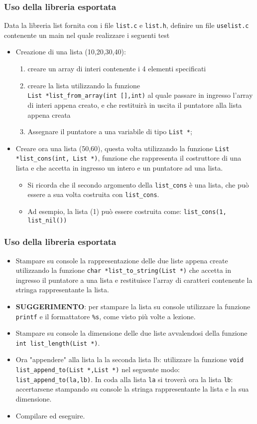 \documentclass{beamer}
\begin{document}
\begin{frame}[fragile]
\frametitle{Uso della libreria esportata}
Data la libreria list fornita con i file \texttt{list.c} e \texttt{list.h}, definire un file \texttt{uselist.c} contenente un main nel quale realizzare i seguenti test
\begin{itemize}
 \item Creazione di una lista (10,20,30,40):
\begin{enumerate}
 \item creare un array di interi contenente i 4 elementi specificati
 \item creare la lista utilizzando la funzione \\ \texttt{List *list\_from\_array(int [],int)} al quale passare in ingresso l'array di interi appena creato, e che restituirà in uscita il puntatore alla lista appena creata
 \item Assegnare il puntatore a una variabile di tipo \texttt{List *};
\end{enumerate}
 \item Creare ora una lista (50,60), questa volta utilizzando la funzione \texttt{List *list\_cons(int, List *)}, funzione che rappresenta il costruttore di una lista e che accetta in ingresso un intero e un puntatore ad una lista.
 \begin{itemize}
  \item Si ricorda che il secondo argomento della \texttt{list\_cons} è una lista, che può essere a sua volta costruita con \texttt{list\_cons}.
  \item Ad esempio, la lista (1) può essere costruita come: \texttt{list\_cons(1, list\_nil())}
 \end{itemize}

\end{itemize}
\end{frame}

\begin{frame}[fragile]
\frametitle{Uso della libreria esportata}
\begin{itemize}
 \item Stampare su console la rappresentazione delle due liste appena create utilizzando la funzione \texttt{char *list\_to\_string(List *)} che accetta in ingresso il puntatore a una lista e restituisce l'array di caratteri contenente la stringa rappresentante la lista. \item \textbf{SUGGERIMENTO}: per stampare la lista su console utilizzare la funzione \texttt{printf} e il formattatore \texttt{\%s}, come visto più volte a lezione.
 \item Stampare su console la dimensione delle due liste avvalendosi della funzione \texttt{int list\_length(List *)}.
 \item Ora "appendere" alla lista la la seconda lista lb: utilizzare la funzione \texttt{void list\_append\_to(List *,List *)} nel seguente modo: \texttt{list\_append\_to(la,lb)}. In coda alla lista \texttt{la} si troverà ora la lista \texttt{lb}: accertarsene stampando su console la stringa rappresentante la lista e la sua dimensione.
 \item Compilare ed eseguire.
\end{itemize}
\end{frame}
\end{document}
